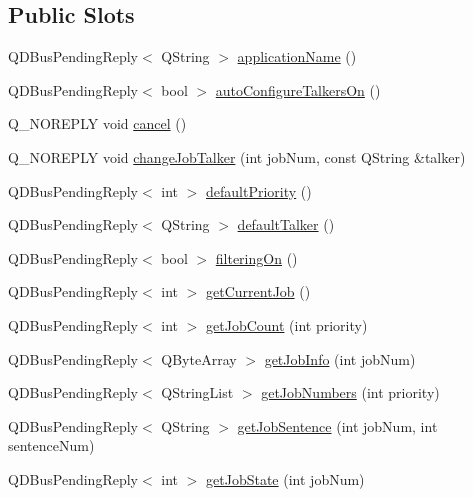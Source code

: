 \subsection*{Public Slots}
\begin{DoxyCompactItemize}
\item 
Q\+D\+Bus\+Pending\+Reply$<$ Q\+String $>$ \hyperlink{classOrgKdeKSpeechInterface_a04f0f63a40f9d8786957512fbe381f6c}{application\+Name} ()
\item 
Q\+D\+Bus\+Pending\+Reply$<$ bool $>$ \hyperlink{classOrgKdeKSpeechInterface_a2dfa018d5a0a66b8056414f5724101a7}{auto\+Configure\+Talkers\+On} ()
\item 
Q\+\_\+\+N\+O\+R\+E\+P\+L\+Y void \hyperlink{classOrgKdeKSpeechInterface_aab83617435d255c8aa2cd705dde1206b}{cancel} ()
\item 
Q\+\_\+\+N\+O\+R\+E\+P\+L\+Y void \hyperlink{classOrgKdeKSpeechInterface_a596c6d7c3b1a507bc90e8e8a19b93bd6}{change\+Job\+Talker} (int job\+Num, const Q\+String \&talker)
\item 
Q\+D\+Bus\+Pending\+Reply$<$ int $>$ \hyperlink{classOrgKdeKSpeechInterface_a25069da5cd0c44b8b9c328df5943d13c}{default\+Priority} ()
\item 
Q\+D\+Bus\+Pending\+Reply$<$ Q\+String $>$ \hyperlink{classOrgKdeKSpeechInterface_a54996547b6db8130dd46af588d807d36}{default\+Talker} ()
\item 
Q\+D\+Bus\+Pending\+Reply$<$ bool $>$ \hyperlink{classOrgKdeKSpeechInterface_afd3f3b84235b84fe7ab787c9fa1e571e}{filtering\+On} ()
\item 
Q\+D\+Bus\+Pending\+Reply$<$ int $>$ \hyperlink{classOrgKdeKSpeechInterface_ae87ad38ecfcf09d5ae79f956c3e737b7}{get\+Current\+Job} ()
\item 
Q\+D\+Bus\+Pending\+Reply$<$ int $>$ \hyperlink{classOrgKdeKSpeechInterface_af2fcb8a4f6ff697dd2440ad4c3125f52}{get\+Job\+Count} (int priority)
\item 
Q\+D\+Bus\+Pending\+Reply$<$ Q\+Byte\+Array $>$ \hyperlink{classOrgKdeKSpeechInterface_a97931a1d4f18f83b8658a5ad63ac805f}{get\+Job\+Info} (int job\+Num)
\item 
Q\+D\+Bus\+Pending\+Reply$<$ Q\+String\+List $>$ \hyperlink{classOrgKdeKSpeechInterface_a761a1c591318a7de9cc48e2ef0c7a871}{get\+Job\+Numbers} (int priority)
\item 
Q\+D\+Bus\+Pending\+Reply$<$ Q\+String $>$ \hyperlink{classOrgKdeKSpeechInterface_ae554268874c6c020d43eac8b80253a46}{get\+Job\+Sentence} (int job\+Num, int sentence\+Num)
\item 
Q\+D\+Bus\+Pending\+Reply$<$ int $>$ \hyperlink{classOrgKdeKSpeechInterface_aa22bb19312576f21185d12f4f2d48a86}{get\+Job\+State} (int job\+Num)

\end{DoxyCompactItemize}
